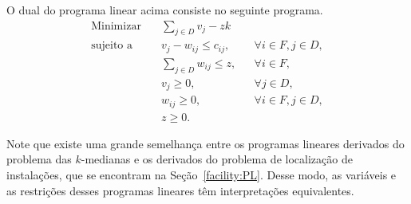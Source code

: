 O dual do programa linear acima consiste no seguinte programa.
\begin{align}
    \text{Minimizar} \quad & \sum_{j \in D} v_j - zk  \nonumber \\
    \text{sujeito a} \quad & v_j - w_{ij} \leq c_{ij}, &&\forall i \in F, j\in D, \nonumber \\
                           & \sum_{j\in D} w_{ij} \leq z, &&\forall i \in F, \nonumber\\
                           & v_j \geq 0, &&\forall j\in D, \nonumber\\
                           & w_{ij} \geq 0, && \forall i \in F,j \in D, \nonumber \\
                           & z \geq 0.  \nonumber
\end{align}

Note que existe uma grande semelhança entre os programas lineares derivados do problema das $k$-medianas e os derivados do problema de localização de instalações, que se encontram na Seção~\ref{facility:PL}. Desse modo, as variáveis e as restrições desses programas lineares têm interpretações equivalentes.
